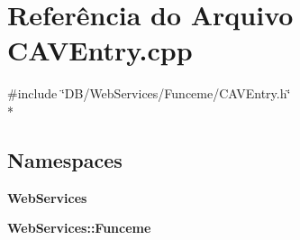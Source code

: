 \section{Referência do Arquivo C\+A\+V\+Entry.\+cpp}
\label{_c_a_v_entry_8cpp}
{\ttfamily \#include \char`\"{}D\+B/\+Web\+Services/\+Funceme/\+C\+A\+V\+Entry.\+h\char`\"{}}\\*
\subsection*{Namespaces}
\begin{DoxyCompactItemize}
\item 
 {\bf Web\+Services}
\item 
 {\bf Web\+Services\+::\+Funceme}
\end{DoxyCompactItemize}
